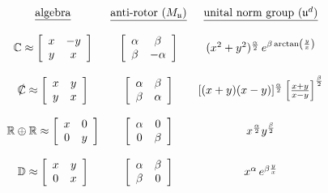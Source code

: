 \documentclass{amsart}
\numberwithin{equation}{section}
\theoremstyle{definition}
\numberwithin{theorem}{section}
\begin{document}
\vspace{.25cm}


\hspace{.7cm}$ \begin{array}{cccccccc} 
\mbox{\underline{algebra}} & \mbox{\underline{anti-rotor $(M_{\mathfrak{u}})$}} & \mbox{\underline{unital norm group ($\mathfrak{u}^d$)}}  \\ 
\\
\mathbb{C} \approx \left[\begin{array}{ccc}
x  & -y    \\
 y & x \\   
\end{array}\right]   & \left[\begin{array}{ccc}
\alpha  & \beta    \\
 \beta & -\alpha \\   
\end{array}\right]  & (x^2+y^2)^{\frac{\alpha}{2}} \,e^{\beta\,{\rm arctan}\left(\frac{y}{x}\right)}  \\ \\
\slashed{\mathbb{C}} \approx \left[\begin{array}{ccc}
x  & y    \\
 y & x \\   
\end{array}\right]   & \left[\begin{array}{ccc}
\alpha  & \beta    \\
 \beta & \alpha \\   
\end{array}\right]  & [(x+y)(x-y)]^{\frac{\alpha}{2}} \left[\frac{x+y}{x-y}\right]^{\frac{\beta}{2}}  \\ \\ 
\mathbb{R}\oplus\mathbb{R} \approx \left[\begin{array}{ccc}
x  & 0    \\
 0 & y \\   
\end{array}\right]   & \left[\begin{array}{ccc}
\alpha  & 0    \\
 0 & \beta \\   
\end{array}\right]  & x^\frac{\alpha}{2} y^\frac{\beta}{2}  \\ \\
\mathbb{D} \approx \left[\begin{array}{ccc}
x  & y    \\
 0 & x \\   
\end{array}\right]   & \left[\begin{array}{ccc}
\alpha  & \beta    \\
 \beta & 0 \\   
\end{array}\right]  & x^\alpha\,e^{\beta \frac{y}{x}}  \\ \\
\end{array} $
\end{document}
